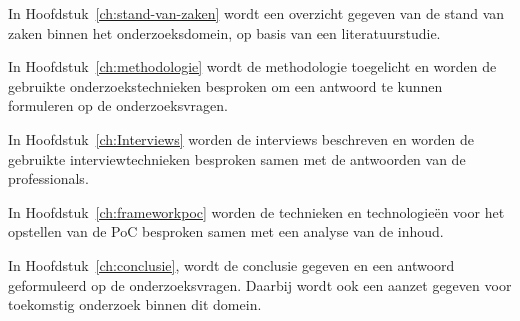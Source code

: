 In Hoofdstuk~\ref{ch:stand-van-zaken} wordt een overzicht gegeven van de stand van zaken binnen het onderzoeksdomein, op basis van een literatuurstudie.

In Hoofdstuk~\ref{ch:methodologie} wordt de methodologie toegelicht en worden de gebruikte onderzoekstechnieken besproken om een antwoord te kunnen formuleren op de onderzoeksvragen.

In Hoofdstuk~\ref{ch:Interviews} worden de interviews beschreven en worden de gebruikte interviewtechnieken besproken samen met de antwoorden van de professionals.

In Hoofdstuk~\ref{ch:frameworkpoc} worden de technieken en technologieën voor het opstellen van de PoC besproken samen met een analyse van de inhoud.

In Hoofdstuk~\ref{ch:conclusie}, wordt de conclusie gegeven en een antwoord geformuleerd op de onderzoeksvragen. Daarbij wordt ook een aanzet gegeven voor toekomstig onderzoek binnen dit domein.